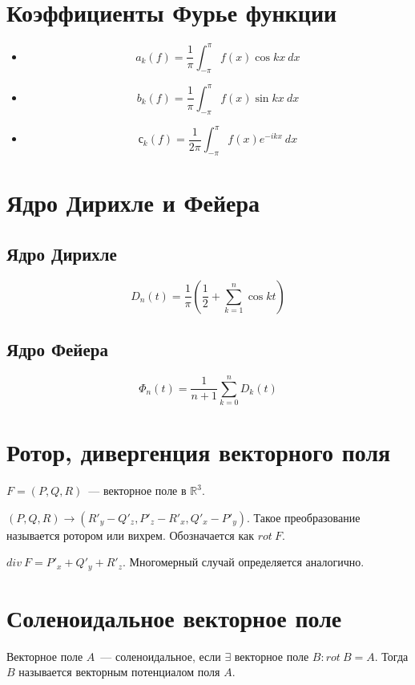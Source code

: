 \documentclass[paper=a4, fontsize=17pt]{article}
\begin{document}
	\section{Коэффициенты Фурье функции}

	\begin{itemize}
		\item $$ a_k(f) = \frac{1}{\pi} \int_{-\pi}^{\pi} f(x) \cos kx ~ dx $$

		\item $$ b_k(f) = \frac{1}{\pi} \int_{-\pi}^{\pi} f(x) \sin kx ~ dx $$

		\item $$ с_k(f) = \frac{1}{2\pi} \int_{-\pi}^{\pi} f(x) e^{-ikx} ~ dx $$

	\end{itemize}

	\section{Ядро Дирихле и Фейера}

	\subsection{Ядро Дирихле}

	$$ D_n(t) = \frac{1}{\pi}( \frac{1}{2} + \sum_{k = 1}^{n} \cos kt) $$

	\subsection{Ядро Фейера}

	$$ \Phi_n(t) = \frac{1}{n+1} \sum_{k = 0}^{n} D_k(t) $$

	\section{Ротор, дивергенция векторного поля}
    $F = (P, Q, R)$~--- векторное поле в $\mathds{R}^3$.

	$(P, Q, R) \rightarrow (R'_y - Q'_z, P'_z - R'_x, Q'_x - P'_y)$. Такое преобразование называется ротором или вихрем. Обозначается как $rot\ F$.

	$div\ F = P'_x + Q'_y + R'_z$. Многомерный случай определяется аналогично.

	\section{Соленоидальное векторное поле}
	Векторное поле $A$~--- соленоидальное, если $\exists$ векторное поле $B: rot\ B = A$. Тогда $B$ называется векторным потенциалом поля $A$.
\end{document}
